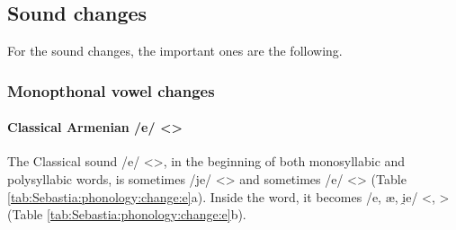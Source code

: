 \begin{adjarianpage}\label{page:226}\end{adjarianpage}%

\subsection{Sound changes}
For the sound changes, the important ones are the following.

\subsubsection{Monopthonal vowel changes}

\paragraph{Classical Armenian /e/ <> }

The Classical sound /e/ <>, in the beginning of both monosyllabic and polysyllabic words, is sometimes /je/ <> and sometimes /e/ <> (Table \ref{tab:Sebastia:phonology:change:e}a). Inside the word, it becomes /e, æ, i̯e/ <, > (Table \ref{tab:Sebastia:phonology:change:e}b). 



\begin{table}[H]
	\centering 
	\caption{Change from Classical Armenian /e/ <> to /je, e, æ, i̯e/ <, > in the Sebastia dialect}
	\label{tab:Sebastia:phonology:change:e}
\end{table}


